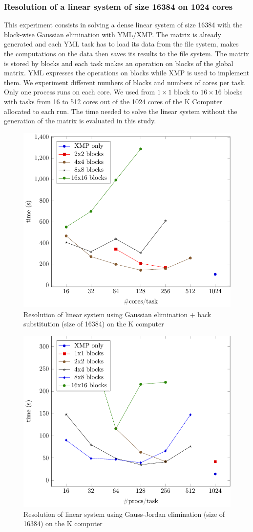 \subsubsection{Resolution of a linear system of size 16384 on 1024 cores}
This experiment consists in solving a dense linear system of size 16384 with the block-wise Gaussian elimination with YML/XMP.
The matrix is already generated and each YML task has to load its data from the file system, makes the computations on the data then saves its results to the file system.
The matrix is stored by blocks and each task makes an operation on blocks of the global matrix.
YML expresses the operations on blocks while XMP is used to implement them.
We experiment different numbers of blocks and numbers of cores per task.
Only one process runs on each core.
We used from $1\times 1$ block to $16\times 16$ blocks with tasks from 16 to 512 cores out of the 1024 cores of the K Computer allocated to each run.
The time needed to solve the linear system without the generation of the matrix is evaluated in this study.

\begin{figure}[h]
	\caption{Resolution of linear system using Gaussian elimination + back substitution (size of 16384) on the K computer\label{fig:K_g}}
	\centering
	\includegraphics[width=.6\textwidth]{figK-g-16k.pdf}
\end{figure}

\begin{figure}[h]
	\caption{Resolution of linear system using Gauss-Jordan elimination (size of 16384) on the K computer\label{fig:K_gj}}
	\centering
	\includegraphics[width=.6\textwidth]{figK-gj-16k.pdf}
\end{figure}

